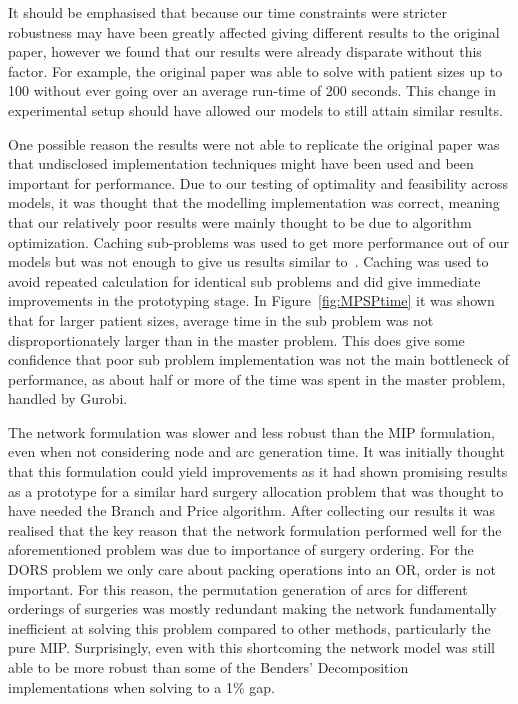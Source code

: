 It should be emphasised that because our time constraints were stricter robustness may have been greatly affected giving different results to the original paper, however we found that our results were already disparate without this factor. For example, the original paper was able to solve with patient sizes up to 100 without ever going over an average run-time of 200 seconds. This change in experimental setup should have allowed our models to still attain similar results.

One possible reason the results were not able to replicate the original paper was that undisclosed implementation techniques might have been used and been important for performance. Due to our testing of optimality and feasibility across models, it was thought that the modelling implementation was correct, meaning that our relatively poor results were mainly thought to be due to algorithm optimization. Caching sub-problems was used to get more performance out of our models but was not enough to give us results similar to~\cite{roshanaei2017propagating}. Caching was used to avoid repeated calculation for identical sub problems and did give immediate improvements in the prototyping stage. In Figure~\ref{fig:MPSPtime} it was shown that for larger patient sizes, average time in the sub problem was not disproportionately larger than in the master problem. This does give some confidence that poor sub problem implementation was not the main bottleneck of performance, as about half or more of the time was spent in the master problem, handled by Gurobi. 

The network formulation was slower and less robust than the MIP formulation, even when not considering node and arc generation time. It was initially thought that this formulation could yield improvements as it had shown promising results as a prototype for a similar hard surgery allocation problem that was thought to have needed the Branch and Price algorithm\cite{DoulabiBranchPriceOR}. After collecting our results it was realised that the key reason that the network formulation performed well for the aforementioned problem was due to importance of surgery ordering. For the DORS problem we only care about packing operations into an OR, order is not important. For this reason, the permutation generation of arcs for different orderings of surgeries was mostly redundant making the network fundamentally inefficient at solving this problem compared to other methods, particularly the pure MIP. Surprisingly, even with this shortcoming the network model was still able to be more robust than some of the Benders' Decomposition implementations when solving to a 1\% gap.

